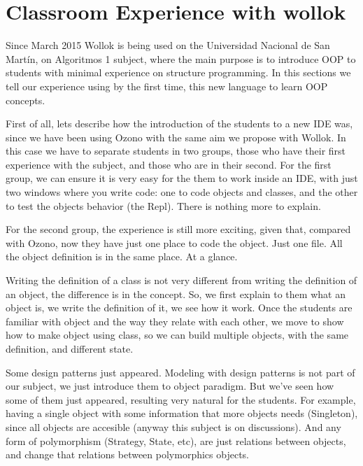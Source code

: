 \section{Classroom Experience with wollok}
\label{experience}

Since March 2015 Wollok is being used on the Universidad Nacional de San Martín, on Algoritmos 1 subject, where the main purpose is to introduce OOP to students with minimal experience on structure programming.
In this sections we tell our experience using by the first time, this new language to learn OOP concepts.

First of all, lets  describe how the introduction of the students to a new IDE was, since we have been using Ozono with the same aim we propose with Wollok. In this case we have to separate students in two groups,  those who have their first experience with the subject, and those who are in their second.
For the first group, we can ensure it is very easy for the them to work inside an IDE, with just two windows where you write code: one to code  objects and classes, and the other to test the objects behavior (the Repl). There is nothing more to explain.

For the second group, the experience is still more exciting, given that, compared with Ozono, now they have just one place to code the object. Just one file. All the object definition is in the same place. At a glance.


Writing the definition of a class is not very different from writing the definition of an object, the difference is in the concept. So, we first explain to them what an object is, we write the definition of it, we see how it work. Once the students are familiar with object and the way they relate with each other, we move to show how to make object using class, so we can build multiple objects, with the same definition, and different state. 

Some design patterns just appeared. Modeling with design patterns is not part of our subject, we just introduce them to object paradigm. But we've seen how some of them just appeared, resulting very natural for the students. For example, having a single object with some information that more objects needs (Singleton), since all objects are accesible (anyway this subject is on discussions). And any form of polymorphism (Strategy, State, etc), are just relations between objects, and change that relations between polymorphics objects.



